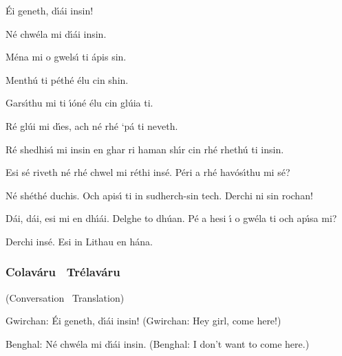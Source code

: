 \begingroup
\fontsize{10pt}{12pt}\selectfont
\begin{leftbubbles}\'{E}i geneth, d\'{\i}\'{a}i insin!\end{leftbubbles}
\begin{rightbubbles}N\'{e} chw\'{e}la mi d\'{\i}\'{a}i insin.\end{rightbubbles}
\begin{leftbubbles}M\'{e}na mi o gwels\'{\i} ti \'{a}pis sin.\end{leftbubbles}
\begin{rightbubbles}Menth\'{u} ti p\'{e}th\'{e} \'{e}lu cin shin.\end{rightbubbles}
\begin{leftbubbles}Gars\'{\i}thu mi ti \'{\i}\'{o}n\'{e} \'{e}lu cin gl\'{u}ia ti.\end{leftbubbles}
\begin{rightbubbles}R\'{e} gl\'{u}i mi d\'{\i}es, ach n\'{e} rh\'{e} ‘p\'{a} ti neveth.\end{rightbubbles}
\begin{leftbubbles}R\'{e} shedhis\'{\i} mi insin en ghar ri haman sh\'{\i}r cin rh\'{e} rheth\'{u} ti insin.\end{leftbubbles}
\begin{rightbubbles}Esi s\'{e} riveth n\'{e} rh\'{e} chwel mi r\'{e}thi ins\'{e}. P\'{e}ri a rh\'{e} hav\'{o}s\'{\i}thu mi s\'{e}?\end{rightbubbles}
\begin{leftbubbles}N\'{e} sh\'{e}th\'{e} duchis. Och apis\'{\i} ti in sudherch-sin tech. Derchi ni sin rochan!\end{leftbubbles}
\begin{rightbubbles}D\'{a}i, d\'{a}i, esi mi en dh\'{\i}\'{a}i. Delghe to dh\'{u}an. P\'{e} a hesi \'{\i} o gw\'{e}la ti och ap\'{\i}sa mi?\end{rightbubbles}
\begin{leftbubbles}Derchi ins\'{e}. Esi in Lithau en h\'{a}na.\end{leftbubbles}
\endgroup

\newpage
\subsubsection{Colav\'{a}ru \textendash\ Tr\'{e}lav\'{a}ru}
(Conversation \textendash\ Translation)

Gwirchan: \'{E}i geneth, d\'{\i}\'{a}i insin!
(Gwirchan: Hey girl, come here!)

Benghal: N\'{e} chw\'{e}la mi d\'{\i}\'{a}i insin.
(Benghal: I don't want to come here.)

